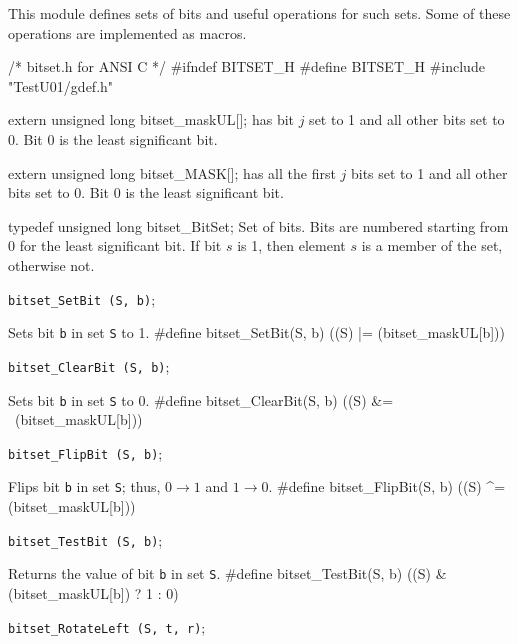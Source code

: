 
This module defines sets of bits and useful operations for such sets.
Some of these operations are implemented as macros.

\code\hide
/* bitset.h  for ANSI C */
#ifndef BITSET_H
#define BITSET_H
#include "TestU01/gdef.h"
\endhide\endcode


\code

extern unsigned long bitset_maskUL[];
\endcode
  has bit $j$ set to 1 and all other bits set to
   0. Bit 0 is the least significant bit.
 \endtab
\code


extern unsigned long bitset_MASK[];
\endcode
  has all the first $j$ bits set to 1 and all other 
  bits set to 0. Bit 0 is the least significant bit. 
 \endtab


\code

typedef unsigned long bitset_BitSet;
\endcode
 \tab  Set of bits. Bits are numbered starting from 0 for the least
  significant bit. If bit $s$ is 1, then element $s$ is a member of 
  the set, otherwise not.
 \endtab




\noindent 
{\tt bitset\_SetBit (S, b)};

 \tab  Sets bit {\tt b} in set  {\tt S}  to 1.
 \endtab
\code
\hide
#define bitset_SetBit(S, b) ((S) |= (bitset_maskUL[b]))
\endhide
\endcode

\noindent 
{\tt bitset\_ClearBit (S, b)};

 \tab  Sets bit {\tt b} in set  {\tt S}  to 0.
 \endtab
\code
\hide
#define bitset_ClearBit(S, b) ((S) &= ~(bitset_maskUL[b]))
\endhide
\endcode

\noindent 
{\tt bitset\_FlipBit (S, b)};

 \tab  Flips bit {\tt b} in set {\tt S}; thus,
  $0 \rightarrow 1$ and $1 \rightarrow 0$.
 \endtab
\code
\hide
#define bitset_FlipBit(S, b) ((S) ^= (bitset_maskUL[b]))
\endhide
\endcode

\noindent 
{\tt bitset\_TestBit (S, b)};

 \tab  Returns the value of bit {\tt b} in set {\tt S}.
 \endtab
\code
\hide
#define bitset_TestBit(S, b)  ((S) & (bitset_maskUL[b]) ? 1 : 0)
\endhide
\endcode

\noindent 
{\tt bitset\_RotateLeft (S, t, r)};

